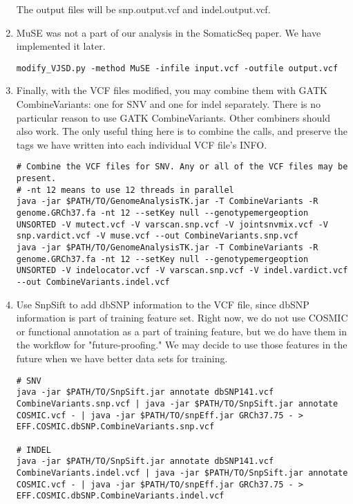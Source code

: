 \documentclass[10pt,letterpaper]{article}
\begin{document}
\begin{sloppypar}
\begin{enumerate}
The output files will be snp.output.vcf and indel.output.vcf. 


\item
MuSE was not a part of our analysis in the SomaticSeq paper. We have implemented it later. 
	
\begin{lstlisting}
modify_VJSD.py -method MuSE -infile input.vcf -outfile output.vcf
\end{lstlisting}

\item
Finally, with the VCF files modified, you may combine them with GATK CombineVariants: one for SNV and one for indel separately. There is no particular reason to use GATK CombineVariants. Other combiners should also work. The only useful thing here is to combine the calls, and preserve the tags we have written into each individual VCF file's INFO. 
	
\begin{lstlisting}
# Combine the VCF files for SNV. Any or all of the VCF files may be present.
# -nt 12 means to use 12 threads in parallel
java -jar $PATH/TO/GenomeAnalysisTK.jar -T CombineVariants -R genome.GRCh37.fa -nt 12 --setKey null --genotypemergeoption UNSORTED -V mutect.vcf -V varscan.snp.vcf -V jointsnvmix.vcf -V snp.vardict.vcf -V muse.vcf --out CombineVariants.snp.vcf
java -jar $PATH/TO/GenomeAnalysisTK.jar -T CombineVariants -R genome.GRCh37.fa -nt 12 --setKey null --genotypemergeoption UNSORTED -V indelocator.vcf -V varscan.snp.vcf -V indel.vardict.vcf --out CombineVariants.indel.vcf
\end{lstlisting}
	
	
\item
Use SnpSift to add dbSNP information to the VCF file, since dbSNP information is part of training feature set. Right now, we do not use COSMIC or functional annotation as a part of training feature, but we do have them in the workflow for "future-proofing." We may decide to use those features in the future when we have better data sets for training. 
	
\begin{lstlisting}
# SNV
java -jar $PATH/TO/SnpSift.jar annotate dbSNP141.vcf CombineVariants.snp.vcf | java -jar $PATH/TO/SnpSift.jar annotate COSMIC.vcf - | java -jar $PATH/TO/snpEff.jar GRCh37.75 - > EFF.COSMIC.dbSNP.CombineVariants.snp.vcf

# INDEL
java -jar $PATH/TO/SnpSift.jar annotate dbSNP141.vcf CombineVariants.indel.vcf | java -jar $PATH/TO/SnpSift.jar annotate COSMIC.vcf - | java -jar $PATH/TO/snpEff.jar GRCh37.75 - > EFF.COSMIC.dbSNP.CombineVariants.indel.vcf
\end{lstlisting}
	


\end{enumerate}
\end{sloppypar}
\end{document}
